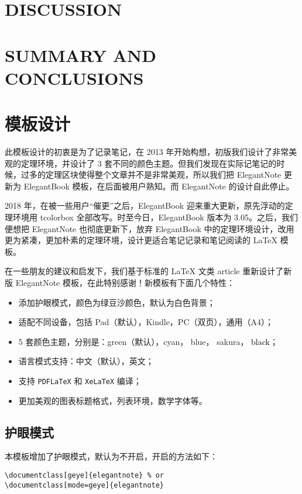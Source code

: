 \documentclass[cn,pad,11pt,green,geye]{../elegantnote}
\begin{document}
\section{DISCUSSION}

\section{SUMMARY AND CONCLUSIONS}


\section{模板设计}
此模板设计的初衷是为了记录笔记，在 2013 年开始构想，初版我们设计了非常美观的定理环境，并设计了 3 套不同的颜色主题。但我们发现在实际记笔记的时候，过多的定理区块使得整个文章并不是非常美观，所以我们把 ElegantNote 更新为 ElegantBook 模板，在后面被用户熟知。而 ElegantNote 的设计自此停止。

2018 年，在被一些用户“催更”之后，ElegantBook 迎来重大更新，原先浮动的定理环境用 tcolorbox 全部改写。时至今日，ElegantBook 版本为 3.05。之后，我们便想把 ElegantNote 也彻底更新下，放弃 ElegantBook 中的定理环境设计，改用更为紧凑，更加朴素的定理环境，设计更适合笔记记录和笔记阅读的 \LaTeX{} 模板。

在一些朋友的建议和启发下，我们基于标准的 \LaTeX{} 文类 article 重新设计了新版 ElegantNote 模板，在此特别感谢！新模板有下面几个特性：
\begin{itemize}
\item 添加护眼模式，颜色为绿豆沙颜色，默认为白色背景；
\item 适配不同设备，包括 Pad（默认），Kindle，PC（双页），通用（A4）；
\item 5 套颜色主题，分别是：\textcolor{egreen}{green}（默认），\textcolor{ecyan}{cyan}， \textcolor{eblue}{blue}， \textcolor{sakura}{sakura}， \textcolor{black}{black}；
\item 语言模式支持：中文（默认），英文；
\item 支持 \lstinline{PDFLaTeX} 和 \lstinline{XeLaTeX} 编译；
\item 更加美观的图表标题格式，列表环境，数学字体等。
\end{itemize}

\subsection{护眼模式}
本模板增加了护眼模式，默认为不开启，开启的方法如下：
\begin{lstlisting}[frame=none]  
\documentclass[geye]{elegantnote} % or
\documentclass[mode=geye]{elegantnote}
\end{lstlisting}
\end{document}
